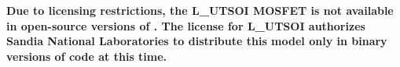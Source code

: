 



\textbf{Due to licensing restrictions, the L\_UTSOI MOSFET is not
  available in open-source versions of \Xyce{}.  The license for
  L\_UTSOI authorizes Sandia National Laboratories to distribute this
  model only in binary versions of code at this time.}

